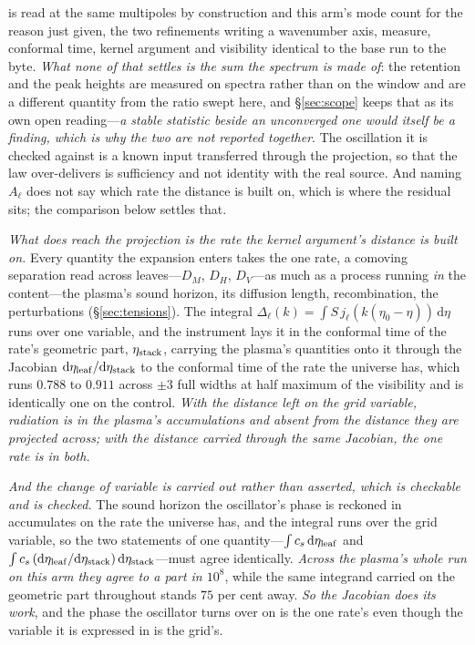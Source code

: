 \documentclass[11pt,a4paper]{article}
\theoremstyle{plain}
\theoremstyle{definition}
\theoremstyle{remark}
\begin{document}
is read at the same multipoles by construction and this arm's mode count for the reason just given, the two
refinements writing a wavenumber axis, measure, conformal time, kernel argument and visibility identical to the
base run to the byte. \emph{What none of
that settles is the sum the spectrum is made of}: the retention and the peak heights are measured on spectra
rather than on the window and are a different quantity from the ratio swept here, and \S\ref{sec:scope} keeps that
as its own open reading---\emph{a stable statistic beside an unconverged one would itself be a finding, which is
why the two are not reported together}. The oscillation it is checked against is a
known input transferred through the projection, so that the law over-delivers is sufficiency and not identity
with the real source. And naming $A_{\ell}$ does not say which rate the distance is built on, which is where the
residual sits; the comparison below settles that.

\emph{What does reach the projection is the rate the kernel argument's distance is built on.} Every quantity
the expansion enters takes the one rate, a comoving separation read across leaves---$D_M$, $D_H$, $D_V$---as
much as a process running \emph{in} the content---the plasma's sound horizon, its diffusion length,
recombination, the perturbations (\S\ref{sec:tensions}). The integral
$\Delta_\ell(k)=\int S\,j_\ell(k(\eta_0-\eta))\,\mathrm d\eta$ runs over one variable, and the instrument lays
it in the conformal time of the rate's geometric part, $\eta_{\rm stack}$, carrying the plasma's quantities
onto it through the Jacobian $\mathrm d\eta_{\rm leaf}/\mathrm d\eta_{\rm stack}$ to the conformal time of
the rate the universe has, which runs $0.788$ to $0.911$ across $\pm3$ full widths at half maximum of the
visibility and is identically one on the
control.
\emph{With the distance left on the grid variable, radiation is in the plasma's accumulations and absent from
the distance they are projected across; with the distance carried through the same Jacobian, the one rate is
in both.}

\emph{And the change of variable is carried out rather than asserted, which is checkable and is checked.}
The sound horizon the oscillator's phase is reckoned in accumulates on the rate the universe has, and the
integral runs over the grid variable, so the two statements of one quantity---$\int c_s\,\mathrm d\eta_{\rm
leaf}$ and $\int c_s\,(\mathrm d\eta_{\rm leaf}/\mathrm d\eta_{\rm stack})\,\mathrm d\eta_{\rm
stack}$---must agree identically. \emph{Across the plasma's whole run on this arm they agree to a part
in $10^{8}$}, while the same integrand carried on the geometric part throughout stands $75$ per cent
away. \emph{So the Jacobian does its work}, and the phase the oscillator turns over on is the one rate's
even though the variable it is expressed in is the grid's.
\end{document}
